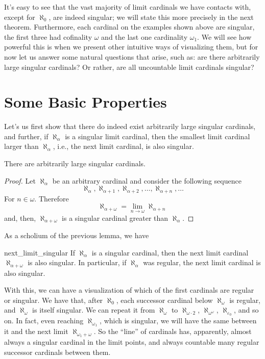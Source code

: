 It's easy to see that the vast majority of limit cardinals we have contacts with, except for $\aleph_0$, are indeed singular; we will state this more precisely in the next theorem. Furthermore, each cardinal on the examples shown above are singular, the first three had cofinality $\omega$ and the last one cardinality $\omega_1$. We will see how powerful this is when we present other intuitive ways of visualizing them, but for now let us answer some natural questions that arise, such as: are there arbitrarily large singular cardinals? Or rather, are all uncountable limit cardinals singular?

\section{Some Basic Properties}

Let's us first show that there do indeed exist arbitrarily large singular cardinals, and further, if $\aleph_\alpha$ is a singular limit cardinal, then the smallest limit cardinal larger than $\aleph_\alpha$, i.e., the next limit cardinal, is also singular.

\begin{lemma}{}{}
    There are arbitrarily large singular cardinals.
\end{lemma}
\begin{proof}
    Let $\aleph_\alpha$ be an arbitrary cardinal and consider the following sequence
    $$\aleph_\alpha,\aleph_{\alpha+1},\aleph_{\alpha+2},\dots,\aleph_{\alpha+n},\dots$$
    For $n\in\omega$. Therefore
    $$\aleph_{\alpha+\omega}=\lim_{n\to\omega}\aleph_{\alpha+n}$$
    and, then, $\aleph_{\alpha+\omega}$ is a singular cardinal greater than $\aleph_\alpha$.
\end{proof}

As a scholium of the previous lemma, we have

\begin{corollary}{}{next_limit_singular}
    If $\aleph_\alpha$ is a singular cardinal, then the next limit cardinal $\aleph_{\alpha+\omega}$ is also singular. In particular, if $\aleph_{\alpha}$ was regular, the next limit cardinal is also singular.
\end{corollary}

With this, we can have a visualization of which of the first cardinals are regular or singular. We have that, after $\aleph_0$, each successor cardinal below $\aleph_\omega$ is regular, and $\aleph_\omega$ is itself singular. We can repeat it from $\aleph_\omega$ to $\aleph_{\omega\cdot 2}$, $\aleph_{\omega^\omega}$, $\aleph_{\varepsilon_0}$, and so on. In fact, even reaching $\aleph_{\omega_1}$, which is singular, we will have the same between it and the next limit $\aleph_{\omega_1+\omega}$. So the ``line'' of cardinals has, apparently, almost always a singular cardinal in the limit points, and always countable many regular successor cardinals between them.

